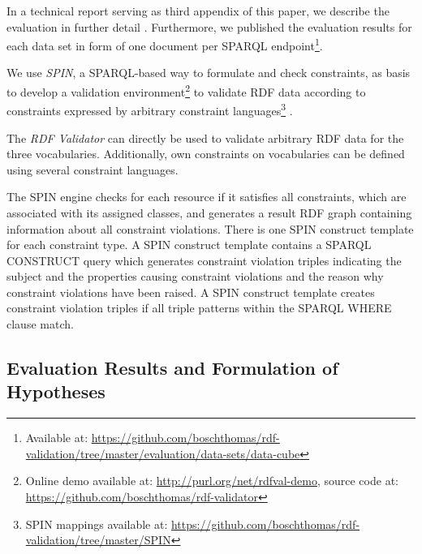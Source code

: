 \documentclass[conference]{IEEEtran}
\begin{document}
In a technical report serving as third appendix of this paper, we describe the evaluation in further detail \cite{BoschZapilkoWackerowEckert2015-2}. Furthermore, we published the evaluation results for each data set in form of one document per SPARQL endpoint\footnote{Available at: \url{https://github.com/boschthomas/rdf-validation/tree/master/evaluation/data-sets/data-cube}}.

We use \emph{SPIN}, a SPARQL-based way to formulate and check constraints, as basis to develop a
validation environment\footnote{Online demo available at: \url{http://purl.org/net/rdfval-demo}, source code at: \url{https://github.com/boschthomas/rdf-validator}} to validate RDF data according to constraints expressed by arbitrary constraint languages\footnote{SPIN mappings available at: \url{https://github.com/boschthomas/rdf-validation/tree/master/SPIN}} \cite{BoschEckert2014-2}.

The \emph{RDF Validator} can directly be used to validate arbitrary RDF data for the three vocabularies. Additionally, own constraints on vocabularies can be defined using several constraint languages.

The SPIN engine checks for each resource if it satisfies all constraints, which are associated with its assigned classes, and generates a result RDF graph containing information about all constraint violations.
There is one SPIN construct template for each constraint type.
A SPIN construct template contains a SPARQL CONSTRUCT query which generates constraint violation triples indicating the subject and the properties causing constraint violations and the reason why constraint violations have been raised.
A SPIN construct template creates constraint violation triples if all triple patterns within the SPARQL WHERE clause match.

\subsection{Evaluation Results and Formulation of Hypotheses}

\end{document}
